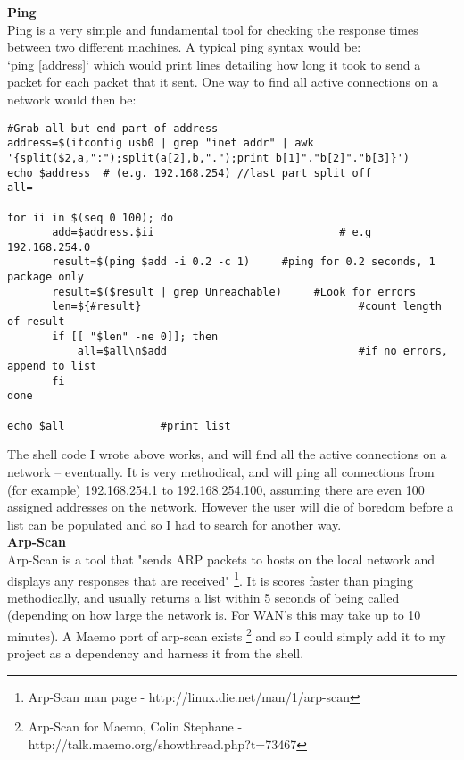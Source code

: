 \documentclass[11pt]{article} %
\begin{document}
{\bf Ping}\\
Ping is a very simple and fundamental tool for checking the response times between two different machines. A typical ping syntax would be:\\
`ping [address]` which would print lines detailing how long it took to send a packet for each packet that it sent.
One way to find all active connections on a network would then be:
\vspace{-15pt}
\begin{lstlisting}[title=\bf Code for pinging all addresses on a network]
#Grab all but end part of address
address=$(ifconfig usb0 | grep "inet addr" | awk '{split($2,a,":");split(a[2],b,".");print b[1]"."b[2]"."b[3]}')
echo $address  # (e.g. 192.168.254) //last part split off
all=

for ii in $(seq 0 100); do
       add=$address.$ii                             # e.g 192.168.254.0
       result=$(ping $add -i 0.2 -c 1)     #ping for 0.2 seconds, 1 package only
       result=$($result | grep Unreachable)     #Look for errors
       len=${#result}                                  #count length of result
       if [[ "$len" -ne 0]]; then                   
           all=$all\n$add                              #if no errors, append to list
       fi
done

echo $all               #print list

\end{lstlisting}
The shell code I wrote above works, and will find all the active connections on a network -- eventually. It is very methodical, and will ping all connections from (for example) 192.168.254.1 to 192.168.254.100, assuming there are even 100 assigned addresses on the network. However the user will die of boredom before a list can be populated and so I had to search for another way.\\

{\bf Arp-Scan}\\
Arp-Scan is a tool that "sends ARP packets to hosts on the local network and displays any responses that are received" \footnote{Arp-Scan man page - http://linux.die.net/man/1/arp-scan}. It is scores faster than pinging methodically, and usually returns a list within 5 seconds of being called (depending on how large the network is. For WAN's this may take up to 10 minutes).
A Maemo port of arp-scan exists \footnote{Arp-Scan for Maemo, Colin Stephane - http://talk.maemo.org/showthread.php?t=73467} and so I could simply add it to my project as a dependency and harness it from the shell.
\end{document}
